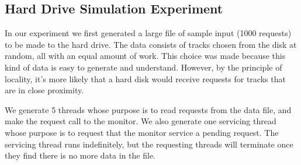 \documentclass[12pt]{report}
\begin{document}
\subsection{Hard Drive Simulation Experiment}
In our experiment we first generated a large file of sample input (1000 requests) to be made to
the hard drive. The data consists of tracks chosen from the disk at random, all with an
equal amount of work. This choice was made because this kind of data is easy to generate
and understand. However, by the principle of locality, it's more likely that a
hard disk would receive requests for tracks that are in close proximity.

We generate 5 threads whose purpose is to read requests from the data file, and make the
request call to the monitor. We also generate one servicing thread whose purpose is to
request that the monitor service a pending request. The servicing thread runs
indefinitely, but the requesting threads will terminate once they find there is no more
data in the file.
\end{document}
